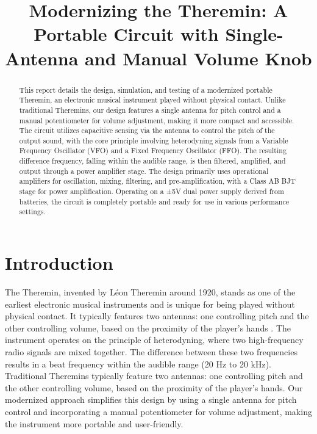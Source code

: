 \documentclass[conference]{IEEEtran}
\begin{document}
\title{Modernizing the Theremin: A Portable Circuit with Single-Antenna and Manual Volume Knob}

\author{
\and
{}
}

\maketitle

\begin{abstract}
    This report details the design, simulation, and testing of a modernized portable Theremin, an electronic musical instrument played without physical contact. Unlike traditional Theremins, our design features a single antenna for pitch control and a manual potentiometer for volume adjustment, making it more compact and accessible. The circuit utilizes capacitive sensing via the antenna to control the pitch of the output sound, with the core principle involving heterodyning signals from a Variable Frequency Oscillator (VFO) and a Fixed Frequency Oscillator (FFO). The resulting difference frequency, falling within the audible range, is then filtered, amplified, and output through a power amplifier stage. The design primarily uses operational amplifiers for oscillation, mixing, filtering, and pre-amplification, with a Class AB BJT stage for power amplification. Operating on a ±5V dual power supply derived from batteries, the circuit is completely portable and ready for use in various performance settings.
\end{abstract}

\section{Introduction}
The Theremin, invented by Léon Theremin around 1920, stands as one of the earliest electronic musical instruments and is unique for being played without physical contact. It typically features two antennas: one controlling pitch and the other controlling volume, based on the proximity of the player's hands \cite{theremin_wiki}. The instrument operates on the principle of heterodyning, where two high-frequency radio signals are mixed together. The difference between these two frequencies results in a beat frequency within the audible range (20 Hz to 20 kHz). Traditional Theremins typically feature two antennas: one controlling pitch and the other controlling volume, based on the proximity of the player's hands. Our modernized approach simplifies this design by using a single antenna for pitch control and incorporating a manual potentiometer for volume adjustment, making the instrument more portable and user-friendly.
\end{document}

